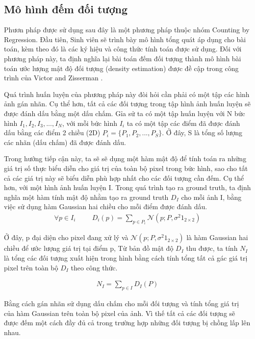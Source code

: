 \subsection{Mô hình đếm đối tượng}
	Phươn pháp được sử dụng sau đây là một phương pháp thuộc nhóm Counting by Regression. Đầu tiên, Sinh viên sẽ trình bày mô hình tổng quát áp dụng cho bài toán, kèm theo đó là các ký hiệu và công thức tính toán được sử dụng. Đối với phương pháp này, ta định nghĩa lại bài toán đếm đối tượng thành mô hình bài toán ước lượng mật độ đối tượng (density estimation) được đề cập trong công trình của Victor and Zisserman \cite{lempitsky2010learning}. \par
	Quá trình huấn luyện của phương pháp này đòi hỏi cần phải có một tập các hình ảnh gán nhãn. Cụ thể hơn, tất cả các đối tượng trong tập hình ảnh huấn luyện sẽ được đánh dấu bằng một dấu chấm. Gỉa sử ta có một tập huấn luyện với N bức hình $I_1,I_2,I_3,...,I_N$, với mỗi bức hình $I_i$ ta có một tập các điểm đã được đánh dấu bằng các điểm 2 chiều (2D) $P_i = \{P_1,P_2,...,P_S\}$. Ở đây, S là tổng số lượng các nhãn (dấu chấm) đã được đánh dấu. \par
	Trong hướng tiếp cận này, ta sẽ sẽ dụng một hàm mật độ để tính toán ra những giá trị số thực biểu diễn cho giá trị của toàn bộ pixel trong bức hình, sao cho tất cả các giá trị này sẽ biểu diễn phù hợp nhất cho các đối tượng cần đếm. Cụ thể hơn, với một hình ảnh huấn luyện I. Trong quá trình tạo ra ground truth, ta định nghĩa một hàm tính mật độ nhằm tạo ra ground truth $D_I$ cho mỗi ảnh I, bằng việc sử dụng hàm Gaussian hai chiều cho mỗi điểm được đánh dấu.
\begin{align}
   \forall p \in I_i   \hspace{1cm}   D_i(p) = \displaystyle \sum_{p \in P_i} \mathcal{N}(p;P,\sigma^2 1_{2\times2})
\end{align}

	Ở đây, p đại diện cho pixel đang xử lý và $\mathcal{N}(p;P,\sigma^2 1_{2\times2})$   là hàm Gaussian hai chiều để ước lượng giá trị tại điểm p,  
	Từ bản đồ mật độ $D_I$ thu được, ta tính $N_I$ là tổng các đối tượng xuất hiện trong hình bằng cách tính tổng tất cả gác giá trị pixel trên toàn bộ $D_I$ theo công thức.
	 
\begin{align}\label{ct3} 
   N_I = \sum_{p \in I}D_I(P)
\end{align}

Bằng cách gán nhãn sử dụng dấu chấm cho mỗi đối tượng và tính tổng giá trị của hàm Gaussian trên toàn bộ pixel của ảnh. Vì thế tất cả các đối tượng sẽ được đếm một cách đầy đủ cả trong trường hợp những đối tượng bị chồng lấp lên nhau.\par

